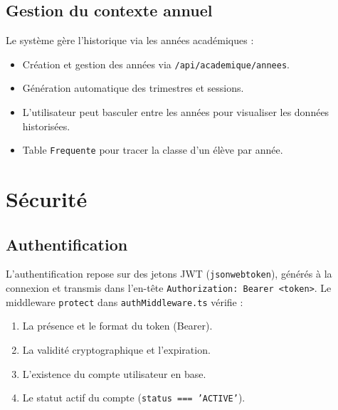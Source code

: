 \documentclass[12pt,a4paper]{report}
\begin{document}
\section{Gestion du contexte annuel}
Le système gère l'historique via les années académiques :
\begin{itemize}[leftmargin=*]
    \item Création et gestion des années via \texttt{/api/academique/annees}.
    \item Génération automatique des trimestres et sessions.
    \item L'utilisateur peut basculer entre les années pour visualiser les données historisées.
    \item Table \texttt{Frequente} pour tracer la classe d'un élève par année.
\end{itemize}
 
\chapter{Sécurité}
 
\section{Authentification}
L'authentification repose sur des jetons JWT (\texttt{jsonwebtoken}), générés à la connexion et transmis dans l'en-tête \texttt{Authorization: Bearer <token>}. Le middleware \texttt{protect} dans \texttt{authMiddleware.ts} vérifie :
\begin{enumerate}
    \item La présence et le format du token (Bearer).
    \item La validité cryptographique et l'expiration.
    \item L'existence du compte utilisateur en base.
    \item Le statut actif du compte (\texttt{status === 'ACTIVE'}).
\end{enumerate}
 
\end{document}
